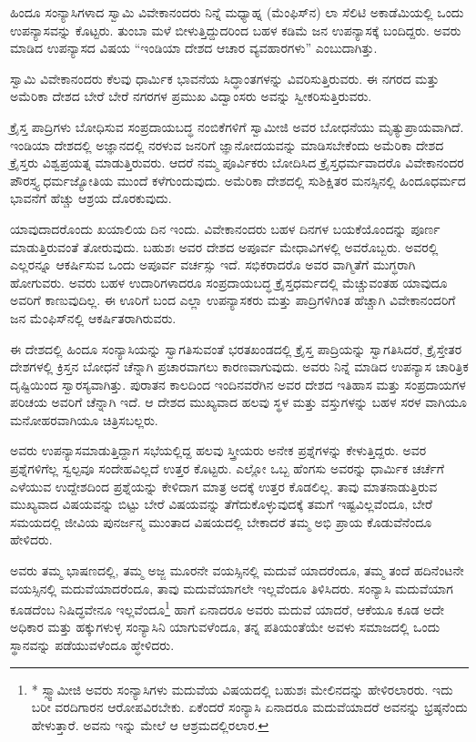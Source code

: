 ಹಿಂದೂ ಸಂನ್ಯಾಸಿಗಳಾದ ಸ್ವಾಮಿ ವಿವೇಕಾನಂದರು ನಿನ್ನೆ ಮಧ್ಯಾಹ್ನ (ಮೆಂಫಿಸ್​ನ) ಲಾ ಸೆಲಿಟಿ ಅಕಾಡೆಮಿಯಲ್ಲಿ ಒಂದು ಉಪನ್ಯಾಸವನ್ನು ಕೊಟ್ಟರು. ತುಂಬಾ ಮಳೆ ಬೀಳುತ್ತಿದ್ದುದರಿಂದ ಬಹಳ ಕಡಿಮೆ ಜನ ಉಪನ್ಯಾಸಕ್ಕೆ ಬಂದಿದ್ದರು. ಅವರು ಮಾಡಿದ ಉಪನ್ಯಾಸದ ವಿಷಯ “ಇಂಡಿಯಾ ದೇಶದ ಆಚಾರ ವ್ಯವಹಾರಗಳು” ಎಂಬುದಾಗಿತ್ತು.

ಸ್ವಾಮಿ ವಿವೇಕಾನಂದರು ಕೆಲವು ಧಾರ್ಮಿಕ ಭಾವನೆಯ ಸಿದ್ಧಾಂತಗಳನ್ನು ವಿವರಿಸುತ್ತಿರುವರು. ಈ ನಗರದ ಮತ್ತು ಅಮೆರಿಕಾ ದೇಶದ ಬೇರೆ ಬೇರೆ ನಗರಗಳ ಪ್ರಮುಖ ವಿದ್ವಾಂಸರು ಅವನ್ನು ಸ್ವೀಕರಿಸುತ್ತಿರುವರು.

ಕ್ರೈಸ್ತ ಪಾದ್ರಿಗಳು ಬೋಧಿಸುವ ಸಂಪ್ರದಾಯಬದ್ಧ ನಂಬಿಕೆಗಳಿಗೆ ಸ್ವಾಮೀಜಿ ಅವರ ಬೋಧನೆಯು ಮೃತ್ಯುಪ್ರಾಯವಾಗಿದೆ. ಇಂಡಿಯಾ ದೇಶದಲ್ಲಿ ಅಜ್ಞಾನದಲ್ಲಿ ನರಳುವ ಜನರಿಗೆ ಜ್ಞಾನೋದಯವನ್ನು ಮಾಡಿಸಬೇಕೆಂದು ಅಮೆರಿಕಾ ದೇಶದ ಕ್ರೈಸ್ತರು ವಿಶ್ವಪ್ರಯತ್ನ ಮಾಡುತ್ತಿರುವರು. ಆದರೆ ನಮ್ಮ ಪೂರ್ವಿಕರು ಬೋದಿಸಿದ ಕ್ರೈಸ್ತಧರ್ಮವಾದರೊ ವಿವೇಕಾನಂದರ ಪೌರಸ್ತ್ಯ ಧರ್ಮಜ್ಯೋತಿಯ ಮುಂದೆ ಕಳೆಗುಂದುವುದು. ಅಮೆರಿಕಾ ದೇಶದಲ್ಲಿ ಸುಶಿಕ್ಷಿತರ ಮನಸ್ಸಿನಲ್ಲಿ ಹಿಂದೂಧರ್ಮದ ಭಾವನೆಗೆ ಹೆಚ್ಚು ಆಶ್ರಯ ದೊರಕುವುದು.

ಯಾವುದಾದರೊಂದು ಖಯಾಲಿಯ ದಿನ ಇಂದು. ವಿವೇಕಾನಂದರು ಬಹಳ ದಿನಗಳ ಬಯಕೆಯೊಂದನ್ನು ಪೂರ್ಣ ಮಾಡುತ್ತಿರುವಂತೆ ತೋರುವುದು. ಬಹುಶಃ ಅವರ ದೇಶದ ಅಪೂರ್ವ ಮೇಧಾವಿಗಳಲ್ಲಿ ಅವರೊಬ್ಬರು. ಅವರಲ್ಲಿ ಎಲ್ಲರನ್ನೂ ಆಕರ್ಷಿಸುವ ಒಂದು ಅಪೂರ್ವ ವರ್ಚಸ್ಸು ಇದೆ. ಸಭಿಕರಾದರೊ ಅವರ ವಾಗ್ಮಿತೆಗೆ ಮುಗ್ಧರಾಗಿ ಹೋಗುವರು. ಅವರು ಬಹಳ ಉದಾರಿಗಳಾದರೂ ಸಂಪ್ರದಾಯಬದ್ಧ ಕ್ರೈಸ್ತಧರ್ಮದಲ್ಲಿ ಮೆಚ್ಚುವಂತಹ ಯಾವುದೂ ಅವರಿಗೆ ಕಾಣುವುದಿಲ್ಲ. ಈ ಊರಿಗೆ ಬಂದ ಎಲ್ಲಾ ಉಪನ್ಯಾಸಕರು ಮತ್ತು ಪಾದ್ರಿಗಳಿಗಿಂತ ಹೆಚ್ಚಾಗಿ ವಿವೇಕಾನಂದರಿಗೆ ಜನ ಮೆಂಫಿಸ್​ನಲ್ಲಿ ಆಕರ್ಷಿತರಾಗಿರುವರು.

ಈ ದೇಶದಲ್ಲಿ ಹಿಂದೂ ಸಂನ್ಯಾಸಿಯನ್ನು ಸ್ವಾಗತಿಸುವಂತೆ ಭರತಖಂಡದಲ್ಲಿ ಕ್ರೈಸ್ತ ಪಾದ್ರಿಯನ್ನು ಸ್ವಾಗತಿಸಿದರೆ, ಕ್ರೈಸ್ತೇತರ ದೇಶಗಳಲ್ಲಿ ಕ್ರಿಸ್ತನ ಬೋಧನೆ ಚೆನ್ನಾಗಿ ಪ್ರಚಾರವಾಗಲು ಕಾರಣವಾಗುವುದು. ಅವರು ನಿನ್ನೆ ಮಾಡಿದ ಉಪನ್ಯಾಸ ಚಾರಿತ್ರಿಕ ದೃಷ್ಟಿಯಿಂದ ಸ್ವಾರಸ್ಯವಾಗಿತ್ತು. ಪುರಾತನ ಕಾಲದಿಂದ ಇಂದಿನವರೆಗಿನ ಅವರ ದೇಶದ ಇತಿಹಾಸ ಮತ್ತು ಸಂಪ್ರದಾಯಗಳ ಪರಿಚಯ ಅವರಿಗೆ ಚೆನ್ನಾಗಿ ಇದೆ. ಆ ದೇಶದ ಮುಖ್ಯವಾದ ಹಲವು ಸ್ಥಳ ಮತ್ತು ವಸ್ತುಗಳನ್ನು ಬಹಳ ಸರಳ ವಾಗಿಯೂ ಮನೋಹರವಾಗಿಯೂ ಚಿತ್ರಿಸಬಲ್ಲರು.

ಅವರು ಉಪನ್ಯಾಸಮಾಡುತ್ತಿದ್ದಾಗ ಸಭೆಯಲ್ಲಿದ್ದ ಹಲವು ಸ್ತ್ರೀಯರು ಅನೇಕ ಪ್ರಶ್ನೆಗಳನ್ನು ಕೇಳುತ್ತಿದ್ದರು. ಅವರ ಪ್ರಶ್ನೆಗಳಿಗೆಲ್ಲ ಸ್ವಲ್ಪವೂ ಸಂದೇಹವಿಲ್ಲದೆ ಉತ್ತರ ಕೊಟ್ಟರು. ಎಲ್ಲೋ ಒಬ್ಬ ಹೆಂಗಸು ಅವರನ್ನು ಧಾರ್ಮಿಕ ಚರ್ಚೆಗೆ ಎಳೆಯುವ ಉದ್ದೇಶದಿಂದ ಪ್ರಶ್ನೆಯನ್ನು ಕೇಳಿದಾಗ ಮಾತ್ರ ಅದಕ್ಕೆ ಉತ್ತರ ಕೊಡಲಿಲ್ಲ. ತಾವು ಮಾತನಾಡುತ್ತಿರುವ ಮುಖ್ಯವಾದ ವಿಷಯವನ್ನು ಬಿಟ್ಟು ಬೇರೆ ವಿಷಯವನ್ನು ತೆಗೆದುಕೊಳ್ಳುವುದಕ್ಕೆ ತಮಗೆ ಇಷ್ಟವಿಲ್ಲವೆಂದೂ, ಬೇರೆ ಸಮಯದಲ್ಲಿ ಜೀವಿಯ ಪುನರ್ಜನ್ಮ ಮುಂತಾದ ವಿಷಯದಲ್ಲಿ ಬೇಕಾದರೆ ತಮ್ಮ ಅಭಿ ಪ್ರಾಯ ಕೊಡುವೆನೆಂದೂ ಹೇಳಿದರು.

ಅವರು ತಮ್ಮ ಭಾಷಣದಲ್ಲಿ, ತಮ್ಮ ಅಜ್ಜ ಮೂರನೇ ವಯಸ್ಸಿನಲ್ಲಿ ಮದುವೆ ಯಾದರೆಂದೂ, ತಮ್ಮ ತಂದೆ ಹದಿನೆಂಟನೇ ವಯಸ್ಸಿನಲ್ಲಿ ಮದುವೆಯಾದರೆಂದೂ, ತಾವು ಮದುವೆಯಾಗಲೇ ಇಲ್ಲವೆಂದೂ ತಿಳಿಸಿದರು. ಸಂನ್ಯಾಸಿ ಮದುವೆಯಾಗ ಕೂಡದೆಂಬ ನಿಷಿದ್ಧವೇನೂ ಇಲ್ಲವೆಂದೂ\footnote{* ಸ್ಸ್ವಾಮೀಜಿ ಅವರು ಸಂನ್ಯಾಸಿಗಳು ಮದುವೆಯ ವಿಷಯದಲ್ಲಿ ಬಹುಶಃ ಮೇಲಿನದನ್ನು ಹೇಳಿರಲಾರರು. ಇದು ಬರೀ ವರದಿಗಾರನ ಆರೋಪವಿರಬೇಕು. ಏಕೆಂದರೆ ಸಂನ್ಯಾಸಿ ಏನಾದರೂ ಮದುವೆಯಾದರೆ ಅವನನ್ನು ಭ್ರಷ್ಠನೆಂದು ಹೇಳುತ್ತಾರೆ. ಅವನು ಇನ್ನು ಮೇಲೆ ಆ ಆಶ್ರಮದಲ್ಲಿರಲಾರ.} ಹಾಗೆ ಏನಾದರೂ ಅವರು ಮದುವೆ ಯಾದರೆ, ಆಕೆಯೂ ಕೂಡ ಅದೇ ಅಧಿಕಾರ ಮತ್ತು ಹಕ್ಕುಗಳುಳ್ಳ ಸಂನ್ಯಾಸಿನಿ ಯಾಗುವಳೆಂದೂ, ತನ್ನ ಪತಿಯಂತೆಯೇ ಅವಳು ಸಮಾಜದಲ್ಲಿ ಒಂದು ಸ್ಥಾನವನ್ನು ಪಡೆಯುವಳೆಂದೂ ಹ್ಧೇಳಿದರು.

